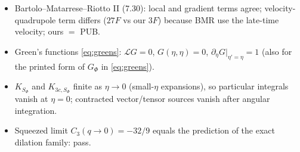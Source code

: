 \begin{itemize}
\item[EF-11] Bartolo--Matarrese--Riotto II (7.30): local and gradient terms agree; velocity-quadrupole term differs ($27F$ vs our $3F$) because BMR use the late-time velocity; ours $=$ PUB.
\item[EF-12] Green's functions \eqref{eq:greens}: $\mathcal LG=0$, $G(\eta,\eta)=0$, $\partial_\eta G|_{\eta'=\eta}=1$ (also for the printed form of $G_\Phi$ in \eqref{eq:greens}).
\item[EF-13] $K_{S_\Phi}$ and $K_{3c,S_\Phi}$ finite as $\eta\to0$ (small-$\eta$ expansions), so particular integrals vanish at $\eta=0$; contracted vector/tensor sources vanish after angular integration.
\item[EF-14] Squeezed limit $C_3(q\to0)=-32/9$ equals the prediction of the exact dilation family: pass.
\end{itemize}

